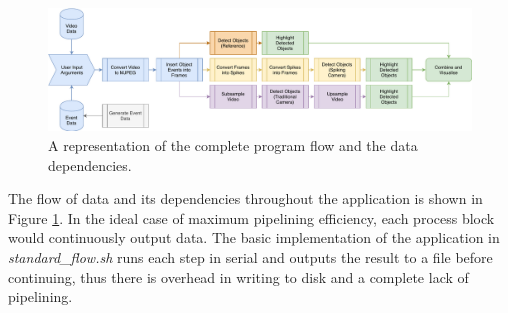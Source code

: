 \documentclass[10pt,twocolumn,letterpaper]{article}
\newcommand{\code}{\textit}
\begin{document}
\begin{figure}
    \includegraphics[width=\textwidth]{process_diagram}
    \caption{A representation of the complete program flow and the data dependencies.}
    \label{fig:process_diagram}
\end{figure}

The flow of data and its dependencies throughout the application is shown in Figure \ref{fig:process_diagram}. In the ideal case of maximum pipelining efficiency, each process block would continuously output data. The basic implementation of the application in \code{standard\_flow.sh} runs each step in serial and outputs the result to a file before continuing, thus there is overhead in writing to disk and a complete lack of pipelining.
\end{document}
